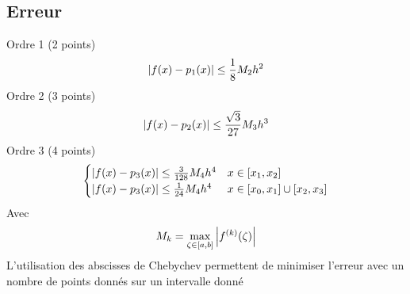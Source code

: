 \documentclass[resume]{subfiles}
\begin{document}
    \subsection{Erreur}
    Ordre 1 (2 points)
    $$\abs{f(x)-p_1(x)}\leq \frac{1}{8}M_2h^2$$
    Ordre 2 (3 points)
    $$\abs{f(x)-p_2(x)}\leq \frac{\sqrt{3}}{27}M_3h^3$$
    Ordre 3 (4 points)
    $$\begin{cases}
        \abs{f(x)-p_3(x)}\leq \frac{3}{128}M_4h^4 & x\in[x_1,x_2]\\
        \abs{f(x)-p_3(x)}\leq \frac{1}{24}M_4h^4  & x\in[x_0,x_1] \cup [x_2,x_3]
    \end{cases}$$
    Avec
    $$M_{k}=\max_{\zeta\in[a,b]}\abs{f^{(k)}(\zeta)}$$
    L'utilisation des abscisses de Chebychev permettent de minimiser l'erreur avec un nombre de points donnés sur un intervalle donné
\end{document}
